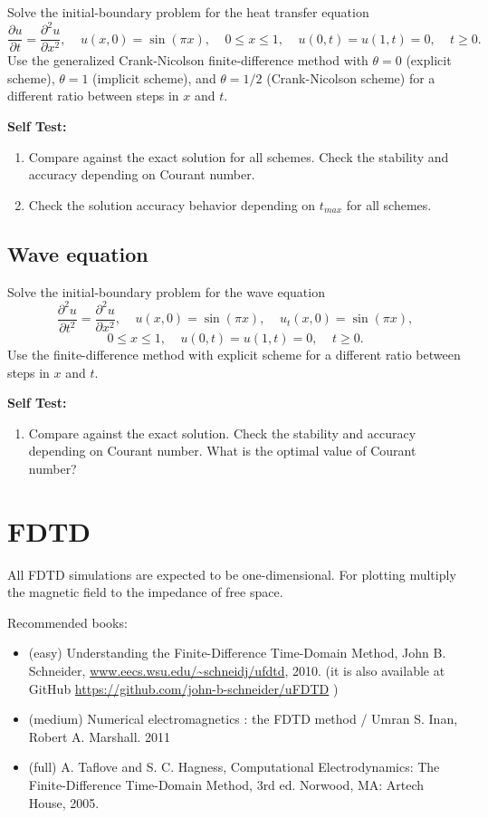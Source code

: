 \documentclass[11pt]{article}
\begin{document}
Solve the initial-boundary problem for the heat transfer equation
 $$ \frac{\partial u}{\partial t}=\frac{\partial^2u}{\partial
x^2},~~~~~ u(x,0)=\sin(\pi x),~~~~~0\le x\le 1,~~~~~
u(0,t)=u(1,t)=0,~~~~~t\ge 0.
 $$
 Use the generalized Crank-Nicolson finite-difference method with
 $\theta=0$ (explicit scheme), $\theta=1$ (implicit scheme), and
 $\theta=1/2$ (Crank-Nicolson scheme) for a different ratio between
 steps in $x$ and $t$.

 \textbf{Self Test:}
\begin{enumerate}
\item Compare against the exact solution for all schemes. Check the stability and accuracy depending on Courant number.
\item Check the solution accuracy behavior depending on $t_{max}$ for all schemes.
 \end{enumerate}


\subsection{Wave equation}
\label{sec:wave-equation}


Solve the initial-boundary problem for the wave  equation
 $$ \frac{\partial^2 u}{\partial t^2}=\frac{\partial^2u}{\partial
x^2},~~~~~ u(x,0)=\sin(\pi x),~~~~~u_t(x,0)=\sin(\pi x),
 $$
 $$
0\le
x\le 1,~~~~~ u(0,t)=u(1,t)=0,~~~~~t\ge 0.
 $$
 Use the finite-difference method with explicit
 scheme for a different ratio between steps in $x$ and $t$.

 \textbf{Self Test:}
\begin{enumerate}
\item Compare against the exact solution. Check the stability and accuracy depending on Courant number. What is the optimal value of Courant number?
 \end{enumerate}


\section{FDTD}

All FDTD simulations are expected to be one-dimensional. For plotting multiply the magnetic field to the impedance of free space.

Recommended books:
\begin{itemize}
  \item (easy) Understanding the Finite-Difference Time-Domain Method,
	   John B. Schneider, \url{www.eecs.wsu.edu/~schneidj/ufdtd}, 2010. (it is
    also available at GitHub \url{https://github.com/john-b-schneider/uFDTD} )
  \item (medium) Numerical electromagnetics : the FDTD method / Umran
    S. Inan, Robert A. Marshall. 2011
  \item (full) A. Taflove and S. C. Hagness, Computational
    Electrodynamics: The Finite-Difference Time-Domain Method, 3rd
    ed. Norwood, MA: Artech House, 2005.
  \end{itemize}
\end{document}
